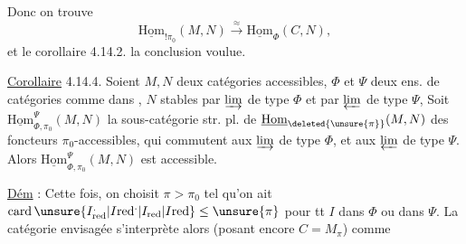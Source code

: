 Donc on trouve
\[
\underline{\mathrm{Hom}}_{!\pi_0}(M,N)\xrightarrow{\approx}\underline{\mathrm{Hom}}_{\Phi}(C,N),
\]
et le corollaire 4.14.2.  la conclusion voulue.

\uline{Corollaire} 4.14.4. Soient $M,N$ deux catégories accessibles, $\Phi$ et $\Psi$ deux ens. de catégories comme dans ,     $N$   stables par $\varinjlim$ de type $\Phi$ et par $\varprojlim$ de type $\Psi$, Soit $\underline{\mathrm{Hom}}_{\Phi,\pi_0}^{\Psi}(M,N)$ la sous-catégorie str. pl. de $\underline{\mathrm{Hom}}_{\deleted{\unsure{\pi}}}(M,N)$  des foncteurs $\pi_0$-accessibles,  qui commutent aux $\varinjlim$ de type $\Phi$, et aux $\varprojlim$ de type $\Psi$. Alors $\underline{\mathrm{Hom}}_{\Phi,\pi_0}^{\Psi}(M,N)$ est accessible.

\uline{Dém} : Cette fois, on choisit $\pi>\pi_0$ tel qu'on ait $\operatorname{card}\unsure{I_{\mathrm{red}}^{.}|I\mathrm{red}^{.}|I_{\mathrm{red}}|I\mathrm{red}}\leq\unsure{\pi}$ pour tt $I$ dans $\Phi$ ou dans $\Psi$. La catégorie envisagée s'interprète alors (posant encore $C=M_{\pi}$) comme 
